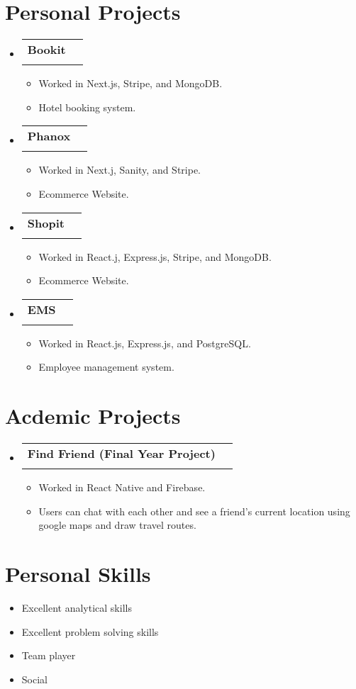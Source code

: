 \documentclass[letterpaper,11pt]{article}
\makeatletter
\newcommand{\resumeItem}[1]{
  \item\small{
    {#1 \vspace{-2pt}}
  }
}
\newcommand{\resumeSubheading}[4]{
  \vspace{-1pt}\item
    \begin{tabular*}{0.97\textwidth}[t]{l@{\extracolsep{\fill}}r}
      \textbf{#1} & #2 \\
      \textit{\small#3} & \textit{\small #4} \\
    \end{tabular*}\vspace{-6pt}
}
\newcommand{\resumeSubHeadingListStart}{\begin{itemize}[leftmargin=0.15in, label={}]}
\newcommand{\resumeSubHeadingListEnd}{\end{itemize}}
\newcommand{\resumeItemListStart}{\begin{itemize}}
\newcommand{\resumeItemListEnd}{\end{itemize}\vspace{-4pt}}
\makeatother
\begin{document}
\section{Personal Projects}
  \resumeSubHeadingListStart
      \resumeSubheading
      {Bookit}{}{}{}\vspace{-12pt}
      \resumeItemListStart
        \resumeItem{Worked in Next.js, Stripe, and MongoDB.}
        \resumeItem{Hotel booking system.}
    \resumeItemListEnd
    \resumeSubheading
    {Phanox}{}{}{}\vspace{-12pt}
      \resumeItemListStart
        \resumeItem{Worked in Next.j, Sanity, and Stripe.}
        \resumeItem{Ecommerce Website.}
    \resumeItemListEnd
    \resumeSubheading
    {Shopit}{}{}{}\vspace{-12pt}
      \resumeItemListStart
        \resumeItem{Worked in React.j, Express.js, Stripe, and MongoDB.}
        \resumeItem{Ecommerce Website.}
    \resumeItemListEnd
    \resumeSubheading
    {EMS}{}{}{}\vspace{-12pt}
      \resumeItemListStart
        \resumeItem{Worked in React.js, Express.js, and PostgreSQL.}
        \resumeItem{Employee management system.}
    \resumeItemListEnd
  \resumeSubHeadingListEnd

\section{Acdemic Projects}
  \resumeSubHeadingListStart
      \resumeSubheading
      {Find Friend (Final Year Project)}{}{}{}\vspace{-12pt}
      \resumeItemListStart
        \resumeItem{Worked in React Native and Firebase.}
        \resumeItem{Users can chat with each other and see a friend's current location using google maps and draw travel routes.}
    \resumeItemListEnd
  \resumeSubHeadingListEnd

\section{Personal Skills}
      \resumeItemListStart
        \resumeItem{Excellent analytical skills}
        \resumeItem{Excellent problem solving skills}
        \resumeItem{Team player}
        \resumeItem{Social}\vspace{-10pt}
    \resumeItemListEnd

\end{document}

